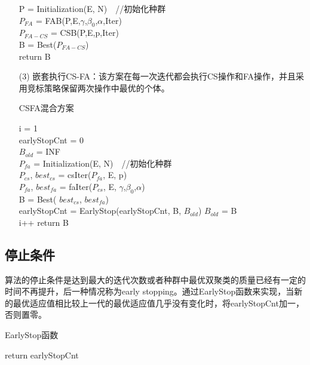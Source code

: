 \begin{enumerate}
\begin{algorithm}[htbp]
        P = Initialization(E, N)　//初始化种群 \\
        $P_{FA}$ = FAB(P,E,$\gamma$,$\beta_0$,$\alpha$,Iter) \\
        $P_{FA-CS}$ = CSB(P,E,p,Iter) \\
        B = Best($P_{FA-CS}$) \\
        return B \\
        \end{algorithm}
       \item[(3)] 嵌套执行CS-FA：该方案在每一次迭代都会执行CS操作和FA操作，并且采用竞标策略保留两次操作中最优的个体。
        \begin{algorithm}[htbp]
        \caption{CSFA混合方案}\label{alg:csfa}
        i = 1 \\
        earlyStopCnt = 0 \\
        $B_{old}$ = INF \\
        $P_{fa}$ = Initialization(E, N)　//初始化种群 \\
        {
            $P_{cs}$, $best_{cs}$ = csIter($P_{fa}$, E, p) \\
            $P_{fa}$, $best_{fa}$ = faIter($P_{cs}$, E, $\gamma$,$\beta_0$,$\alpha$) \\
            B = Best( $best_{cs}$, $best_{fa}$) \\
            earlyStopCnt = EarlyStop(earlyStopCnt, B, $B_{old}$)
            $B_{old}$ = B \\
            i++
        }
        return B
        \end{algorithm}
    \end{enumerate}
    \subsection{停止条件}
    算法的停止条件是达到最大的迭代次数或者种群中最优双聚类的质量已经有一定的时间不再提升，后一种情况称为early stopping。通过EarlyStop函数来实现，当新的最优适应值相比较上一代的最优适应值几乎没有变化时，将earlyStopCnt加一，否则置零。
    \begin{algorithm}[htbp]
    \caption{EarlyStop函数}
    \SetAlgoLined
        return earlyStopCnt 
    \end{algorithm}


